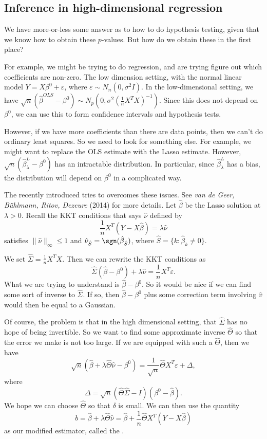 \documentclass[a4paper]{article}
\begin{document}
\subsection{Inference in high-dimensional regression}
We have more-or-less some answer as to how to do hypothesis testing, given that we know how to obtain these $p$-values. But how do we obtain these in the first place?

For example, we might be trying to do regression, and are trying figure out which coefficients are non-zero. The low dimension setting, with the normal linear model $Y = X\beta^0 + \varepsilon$, where $\varepsilon \sim N_n(0, \sigma^2 I)$. In the low-dimensional setting, we have $\sqrt{n}(\hat{\beta}^{OLS} - \beta^0) \sim N_p(0, \sigma^2(\frac{1}{n} X^T X)^{-1})$. Since this does not depend on $\beta^0$, we can use this to form confidence intervals and hypothesis tests.

However, if we have more coefficients than there are data points, then we can't do ordinary least squares. So we need to look for something else. For example, we might want to replace the OLS estimate with the Lasso estimate. However, $\sqrt{n}(\hat{\beta}_\lambda^L - \beta^0)$ has an intractable distribution. In particular, since $\hat{\beta}_\lambda^L$ has a bias, the distribution will depend on $\beta^0$ in a complicated way.

The recently introduced  tries to overcomes these issues. See \emph{van de Geer, B\"uhlmann, Ritov, Dezeure} (2014) for more details. Let $\hat{\beta}$ be the Lasso solution at $\lambda > 0$. Recall the KKT conditions that says $\hat{\nu}$ defined by
\[
  \frac{1}{n} X^T (Y - X \hat{\beta}) = \lambda \hat{\nu}
\]
satisfies $\|\hat{\nu}\|_\infty \leq 1$ and $\hat{\nu}_{\hat{S}} = \sgn (\hat{\beta}_{\hat{S}})$, where $\hat{S} = \{k : \hat{\beta}_k \not= 0\}$.

We set $\hat{\Sigma} = \frac{1}{n} X^T X$. Then we can rewrite the KKT conditions as
\[
  \hat{\Sigma} (\hat{\beta} - \beta^0) + \lambda \hat{\nu} = \frac{1}{n} X^T \varepsilon.
\]
What we are trying to understand is $\hat{\beta} - \beta^0$. So it would be nice if we can find some sort of inverse to $\hat{\Sigma}$. If so, then $\hat{\beta} - \beta^0$ plus some correction term involving $\hat{v}$ would then be equal to a Gaussian.

Of course, the problem is that in the high dimensional setting, that $\hat{\Sigma}$ has no hope of being invertible. So we want to find some approximate inverse $\hat{\Theta}$ so that the error we make is not too large. If we are equipped with such a $\hat{\Theta}$, then we have
\[
  \sqrt{n} (\hat{\beta} + \lambda \hat{\Theta} \hat{\nu} - \beta^0) = \frac{1}{\sqrt{n}} \hat{\Theta} X^T \varepsilon + \Delta,
\]
where
\[
  \Delta = \sqrt{n}(\hat{\Theta} \hat{\Sigma} - I)(\beta^0 - \hat{\beta}).
\]
We hope we can choose $\hat{\Theta}$ so that $\delta$ is small. We can then use the quantity
\[
  b = \hat{\beta} + \lambda \hat{\Theta} \hat{\nu} = \hat{\beta} + \frac{1}{n} \hat{\Theta} X^T (Y - X \hat{\beta})
\]
as our modified estimator, called the .
\end{document}
